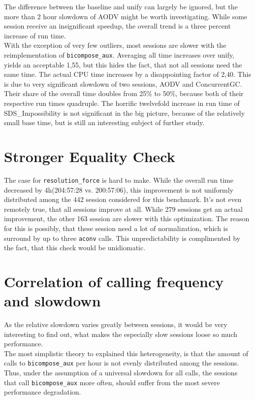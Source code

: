The difference between the baseline and unify can largely be ignored, but the more than 2 hour slowdown of AODV might be worth investigating. While some session receive an insignificant speedup, the overall trend is a three percent increase of run time.\\
With the exception of very few outliers, most sessions are slower with the reimplementation of \texttt{bicompose\_aux}. Averaging all time increases over unify, yields an acceptable 1,55, but this hides the fact, that not all sessions need the same time. The actual CPU time increases by a disappointing factor of 2,40. This is due to very significant slowdown of two sessions, AODV and ConcurrentGC. Their share of the overall time doubles from 25\% to 50\%, because both of their respective run times quadruple. The horrific twelvefold increase in run time of SDS\_Impossibility is not significant in the big picture, because of the relatively small base time, but is still an interesting subject of further study.

\section{Stronger Equality Check}

The case for \texttt{resolution\_force} is hard to make. While the overall run time decreased by 4h(204:57:28 vs. 200:57:06), this improvement is not uniformly distributed among the 442 session considered for this benchmark. It's not even remotely true, that all sessions improve at all. While 279 sessions get an actual improvement, the other 163 session are slower with this optimization. The reason for this is possibly, that these session need a lot of normalization, which is surround by up to three \texttt{aconv} calls. This unpredictability is complimented by the fact, that this check would be unidiomatic.

\section{Correlation of calling frequency and slowdown}

As the relative slowdown varies greatly between sessions, it would be very interesting to find out, what makes the especially slow sessions loose so much performance.\\
The most simplistic theory to explained this heterogeneity, is that the amount of calls to \texttt{bicompose\_aux} per hour is not evenly distributed among the sessions. Thus, under the assumption of a universal slowdown for all calls, the sessions that call \texttt{bicompose\_aux} more often, should suffer from the most severe performance degradation.

